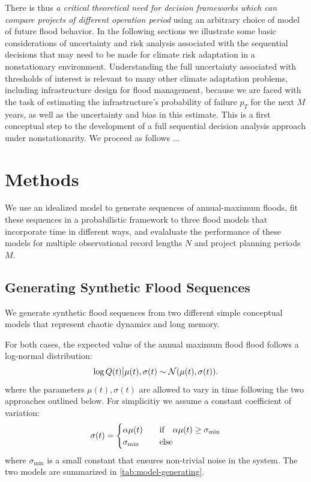 \documentclass[12pt]{article}
\begin{document}
There is thus \emph{a critical theoretical need for decision frameworks which can compare projects of different operation period} using an arbitrary choice of model of future flood behavior.
In the following sections we illustrate some basic considerations of uncertainty and risk analysis associated with the sequential decisions that may need to be made for climate risk adaptation in a nonstationary environment.
Understanding the full uncertainty associated with thresholds of interest is relevant to many other climate adaptation problems, including infrastructure design for flood management, because we are faced with the task of estimating the infrastructure's probability of failure \(p_T\) for the next \(M\) years, as well as the uncertainty and bias in this estimate.
This is a first conceptual step to the development of a full sequential decision analysis approach under nonstationarity.
We proceed as follows \(\ldots{}\)

\section{Methods}\label{sec:methods}

We use an idealized model to generate sequences of annual-maximum floods, fit these sequences in a probabilistic framework to three flood models that incorporate time in different ways, and evalaluate the performance of these models for multiple observational record lengths \(N\) and project planning periods \(M\).

\subsection{Generating Synthetic Flood Sequences\label{sec:methods-generating}}

We generate synthetic flood sequences from two different simple conceptual models that represent chaotic dynamics and long memory.

For both cases, the expected value of the annual maximum flood flood follows a log-normal distribution:
\begin{equation} \label{eq:lognormal}
  \log Q(t) \big| \mu(t),\sigma(t) \sim \mathcal{N} \qty(\mu(t), \sigma(t)).
\end{equation}
where the parameters \( \mu(t), \sigma(t) \) are allowed to vary in time following the two approaches outlined below.
For simplicitiy we assume a constant coefficient of variation:
\begin{equation}
  \sigma(t) = \begin{cases} \alpha \mu(t) & \qqtext{if} \alpha \mu(t) \geq \sigma_\text{min} \\ \sigma_\text{min} & \qqtext{else} \end{cases}
\end{equation}
where \(\sigma_\text{min}\) is a small constant that ensures non-trivial noise in the system.
The two models are summarized in \cref{tab:model-generating}.
\end{document}

